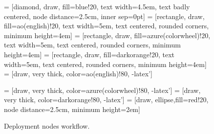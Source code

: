 \documentclass[
  printed, %
  table,   %
  nolof,     %
  nolot,     %
           oneside, color
]{fithesis3}
\renewcommand{\texttt}[1]{%
  \begingroup
  \ttfamily
  \begingroup\lccode`~=`/\lowercase{\endgroup\def~}{/\discretionary{}{}{}}%
  \begingroup\lccode`~=`[\lowercase{\endgroup\def~}{[\discretionary{}{}{}}%
  \begingroup\lccode`~=`.\lowercase{\endgroup\def~}{.\discretionary{}{}{}}%
  \catcode`/=\active\catcode`[=\active\catcode`.=\active
  \scantokens{#1\noexpand}%
  \endgroup
}
\begin{document}
\begin{figure}[H]
\center
{} = [diamond, draw, fill=blue!20,
    text width=4.5em, text badly centered, node distance=2.5cm, inner sep=0pt]
 = [rectangle, draw, fill=ao(english)!20,
    text width=5em, text centered, rounded corners, minimum height=4em]
 = [rectangle, draw, fill=azure(colorwheel)!20,
    text width=5em, text centered, rounded corners, minimum height=4em]
 = [rectangle, draw, fill=darkorange!20,
    text width=5em, text centered, rounded corners, minimum height=4em]
 = [draw, very thick, color=ao(english)!80, -latex']

 = [draw, very thick, color=azure(colorwheel)!80, -latex']
 = [draw, very thick, color=darkorange!80, -latex']
 = [draw, ellipse,fill=red!20, node distance=2.5cm,
    minimum height=2em]

\caption{Deployment nodes workflow.}
\label{pict:deployment-workflow}
\end{figure}
\vspace{-1em}
\end{document}
